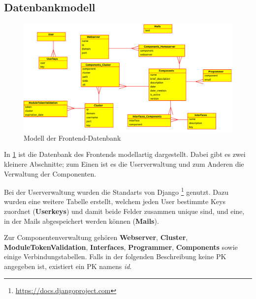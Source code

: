 \subsection{Datenbankmodell}

\begin{figure}[H]
  \begin{center}
	\includegraphics[width=\linewidth]{bilder/ctl-db.pdf}
	\caption{Modell der Frontend-Datenbank}
	\label{fb_db}
  \end{center}
\end{figure}

In \ref{fb_db} ist die Datenbank des Frontends modellartig dargestellt. Dabei
gibt es zwei kleinere Abschnitte; zum Einen ist es die Userverwaltung und zum
Anderen die Verwaltung der Componenten. 

Bei der Userverwaltung wurden die Standarts von Django
\footnote{\url{https://docs.djangoproject.com}} genutzt. Dazu wurden eine
weitere Tabelle erstellt, welchem jeden User bestimmte Keys zuordnet
(\textbf{Userkeys}) und damit beide Felder zusammen unique sind, und eine, in 
der Mails abgespeichert werden können (\textbf{Mails}).

Zur Componentenverwaltung gehören \textbf{Webserver}, \textbf{Cluster},
\textbf{ModuleTokenValidation}, \textbf{Interfaces}, \textbf{Programmer}, 
\textbf{Components} sowie einige Verbindungstabellen.
Falls in der folgenden Beschreibung keine PK angegeben ist, existiert ein PK
namens \textit{id}. 

